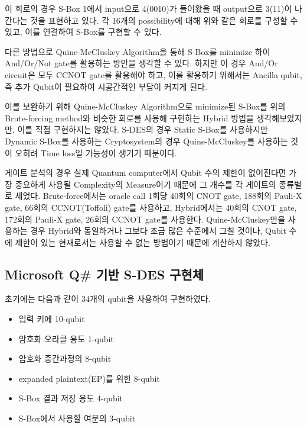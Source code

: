 \documentclass{article}
\theoremstyle{break}
\begin{document}
	이 회로의 경우 S-Box 1에서 input으로 4(0010)가 들어왔을 때 output으로 3(11)이 나간다는 것을 표현하고 있다. 각 16개의 possibility에 대해 위와 같은 회로를 구성할 수 있고, 이를 연결하여 S-Box를 구현할 수 있다.
	
	다른 방법으로 Quine-McCluskey Algorithm을 통해 S-Box를 minimize 하여 And/Or/Not gate를 활용하는 방안을 생각할 수 있다. 하지만 이 경우 And/Or circuit은 모두 CCNOT gate를 활용해야 하고, 이를 활용하기 위해서는 Ancilla qubit, 즉 추가 Qubit이 필요하여 시공간적인 부담이 커지게 된다.
	
	이를 보완하기 위해 Quine-McCluskey Algorithm으로 minimize된 S-Box를 위의 Brute-forcing method와 비슷한 회로를 사용해 구현하는 Hybrid 방법을 생각해보았지만, 이를 직접 구현하지는 않았다. S-DES의 경우 Static S-Box를 사용하지만 Dynamic S-Box를 사용하는 Cryptosystem의 경우 Quine-McCluskey를 사용하는 것이 오히려 Time loss일 가능성이 생기기 때문이다.
	
	게이트 분석의 경우 실제 Quantum computer에서 Qubit 수의 제한이 없어진다면 가장 중요하게 사용될 Complexity의 Measure이기 때문에 그 개수를 각 게이트의 종류별로 세었다. Brute-force에서는 oracle call 1회당 40회의 CNOT gate, 188회의 Pauli-X gate, 66회의 CCNOT(Toffoli) gate를 사용하고, Hybrid에서는 40회의 CNOT gate, 172회의 Pauli-X gate, 26회의 CCNOT gate를 사용한다. Quine-McCluskey만을 사용하는 경우 Hybrid와 동일하거나 그보다 조금 많은 수준에서 그칠 것이나, Qubit 수에 제한이 있는 현재로서는 사용할 수 없는 방법이기 때문에 계산하지 않았다.
	
    \subsection{Microsoft Q\# 기반 S-DES 구현체}
    초기에는 다음과 같이 34개의 qubit을 사용하여 구현하였다.
    \begin{itemize}
        \item 입력 키에 10-qubit
        \item 암호화 오라클 용도 1-qubit
        \item 암호화 중간과정의 8-qubit
        \item expanded plaintext(EP)를 위한 8-qubit
        \item S-Box 결과 저장 용도 4-qubit
        \item S-Box에서 사용할 여분의 3-qubit
    \end{itemize}
    
\end{document}
